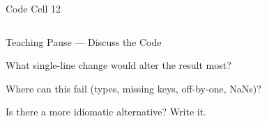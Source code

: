 \documentclass[notes,11pt, aspectratio=169, xcolor=table]{beamer}
\newenvironment{wideitemize}{\itemize\addtolength{\itemsep}{10pt}}{\enditemize}
\begin{document}
\begin{frame}[fragile]{Code Cell 12}
\begin{verbatim}

\end{verbatim}

\end{frame}

\begin{frame}{Teaching Pause — Discuss the Code}
\begin{wideitemize}
\item What single-line change would alter the result most?
\item Where can this fail (types, missing keys, off-by-one, NaNs)?
\item Is there a more idiomatic alternative? Write it.
\end{wideitemize}
\end{frame}
\end{document}
